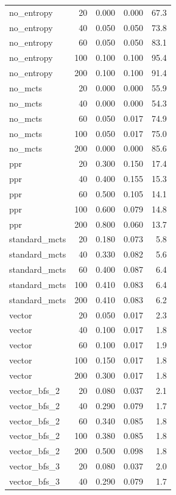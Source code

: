 \begin{tabular}{lrrrr}
no\_entropy & 20 & 0.000 & 0.000 & 67.3 \\
no\_entropy & 40 & 0.050 & 0.050 & 73.8 \\
no\_entropy & 60 & 0.050 & 0.050 & 83.1 \\
no\_entropy & 100 & 0.100 & 0.100 & 95.4 \\
no\_entropy & 200 & 0.100 & 0.100 & 91.4 \\
no\_mcts & 20 & 0.000 & 0.000 & 55.9 \\
no\_mcts & 40 & 0.000 & 0.000 & 54.3 \\
no\_mcts & 60 & 0.050 & 0.017 & 74.9 \\
no\_mcts & 100 & 0.050 & 0.017 & 75.0 \\
no\_mcts & 200 & 0.000 & 0.000 & 85.6 \\
ppr & 20 & 0.300 & 0.150 & 17.4 \\
ppr & 40 & 0.400 & 0.155 & 15.3 \\
ppr & 60 & 0.500 & 0.105 & 14.1 \\
ppr & 100 & 0.600 & 0.079 & 14.8 \\
ppr & 200 & 0.800 & 0.060 & 13.7 \\
standard\_mcts & 20 & 0.180 & 0.073 & 5.8 \\
standard\_mcts & 40 & 0.330 & 0.082 & 5.6 \\
standard\_mcts & 60 & 0.400 & 0.087 & 6.4 \\
standard\_mcts & 100 & 0.410 & 0.083 & 6.4 \\
standard\_mcts & 200 & 0.410 & 0.083 & 6.2 \\
vector & 20 & 0.050 & 0.017 & 2.3 \\
vector & 40 & 0.100 & 0.017 & 1.8 \\
vector & 60 & 0.100 & 0.017 & 1.9 \\
vector & 100 & 0.150 & 0.017 & 1.8 \\
vector & 200 & 0.300 & 0.017 & 1.8 \\
vector\_bfs\_2 & 20 & 0.080 & 0.037 & 2.1 \\
vector\_bfs\_2 & 40 & 0.290 & 0.079 & 1.7 \\
vector\_bfs\_2 & 60 & 0.340 & 0.085 & 1.8 \\
vector\_bfs\_2 & 100 & 0.380 & 0.085 & 1.8 \\
vector\_bfs\_2 & 200 & 0.500 & 0.098 & 1.8 \\
vector\_bfs\_3 & 20 & 0.080 & 0.037 & 2.0 \\
vector\_bfs\_3 & 40 & 0.290 & 0.079 & 1.7 \\

\end{tabular}
